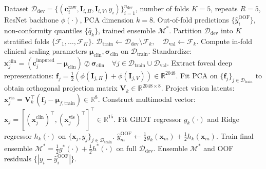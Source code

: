 \documentclass[preprint,12pt]{elsarticle}
\begin{document}
\begin{algorithm}[!t]
\caption{Multimodal Late Fusion and Joint Prognostic Calibration}
\label{alg:multimodal_fusion}
\begin{algorithmic}[1]
\REQUIRE Dataset $\mathcal{D}_{\text{dev}} = \{(\mathbf{c}_i^{\text{raw}}, \mathbf{I}_{i,H}, \mathbf{I}_{i,V}, y_i)\}_{i=1}^{n_{\text{dev}}}$, number of folds $K=5$, repeats $R=5$, ResNet backbone $\phi(\cdot)$, PCA dimension $k=8$.
\ENSURE Out-of-fold predictions $\{\hat{y}_i^{\text{OOF}}\}$, non-conformity quantiles $\{\hat{q}_k\}$, trained ensemble $\mathcal{M}^*$.
    \STATE Partition $\mathcal{D}_{\text{dev}}$ into $K$ stratified folds $\{\mathcal{F}_1, \dots, \mathcal{F}_K\}$.
        \STATE $\mathcal{D}_{\text{train}} \leftarrow \mathcal{D}_{\text{dev}} \setminus \mathcal{F}_k, \quad \mathcal{D}_{\text{val}} \leftarrow \mathcal{F}_k$.
        \STATE Compute in-fold clinical scaling parameters $\bm{\mu}_{\text{clin}}, \bm{\sigma}_{\text{clin}}$ on $\mathcal{D}_{\text{train}}$.
        \STATE Standardize: $\mathbf{x}_j^{\text{clin}} = (\mathbf{c}_j^{\text{imputed}} - \bm{\mu}_{\text{clin}}) \oslash \bm{\sigma}_{\text{clin}} \quad \forall j \in \mathcal{D}_{\text{train}} \cup \mathcal{D}_{\text{val}}$.
        \STATE Extract foveal deep representations: $\mathbf{f}_j = \frac{1}{2}\left(\phi(\mathbf{I}_{j,H}) + \phi(\mathbf{I}_{j,V})\right) \in \mathbb{R}^{2048}$.
        \STATE Fit PCA on $\{\mathbf{f}_j\}_{j \in \mathcal{D}_{\text{train}}}$ to obtain orthogonal projection matrix $\mathbf{V}_k \in \mathbb{R}^{2048 \times 8}$.
        \STATE Project vision latents: $\mathbf{x}_j^{\text{vis}} = \mathbf{V}_k^{\top}(\mathbf{f}_j - \bm{\mu}_{f,\text{train}}) \in \mathbb{R}^8$.
        \STATE Construct multimodal vector: $\mathbf{x}_j = [(\mathbf{x}_j^{\text{clin}})^{\top}, (\mathbf{x}_j^{\text{vis}})^{\top}]^{\top} \in \mathbb{R}^{15}$.
        \STATE Fit GBDT regressor $g_k(\cdot)$ and Ridge regressor $h_k(\cdot)$ on $\{\mathbf{x}_j, y_j\}_{j \in \mathcal{D}_{\text{train}}}$.
            \STATE $\hat{y}_m^{\text{OOF}} \leftarrow \frac{1}{2}g_k(\mathbf{x}_m) + \frac{1}{2}h_k(\mathbf{x}_m)$.
        \ENDFOR
    \ENDFOR
\ENDFOR
\STATE Train final ensemble $\mathcal{M}^* = \frac{1}{2}g^*(\cdot) + \frac{1}{2}h^*(\cdot)$ on full $\mathcal{D}_{\text{dev}}$.
\RETURN Ensemble $\mathcal{M}^*$ and OOF residuals $\{|y_i - \hat{y}_i^{\text{OOF}}|\}$.
\end{algorithmic}
\end{algorithm}
\end{document}
